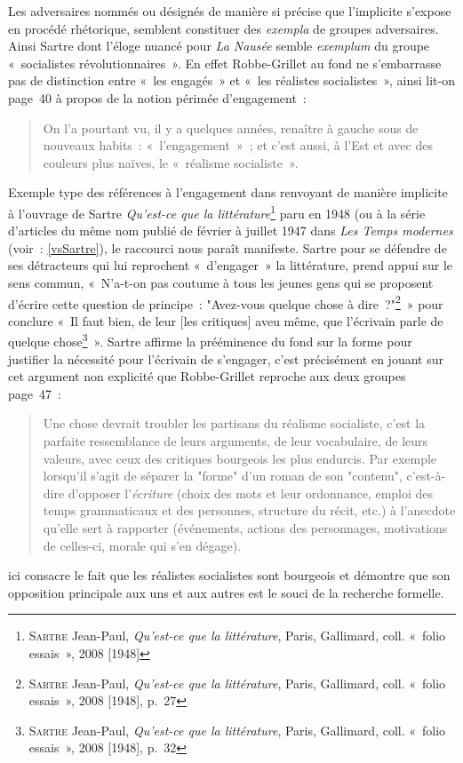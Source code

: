 \documentclass[12pt, a4paper]{article}
\begin{document}
Les adversaires nommés ou désignés de manière si précise que l'implicite s'expose en procédé rhétorique, semblent constituer des \textit{exempla} de groupes adversaires. Ainsi Sartre dont l'éloge nuancé pour \textit{La Nausée} semble \textit{exemplum} du groupe «~socialistes révolutionnaires~». En effet Robbe-Grillet au fond ne s'embarrasse pas de distinction entre «~les engagés~» et «~les réalistes socialistes~», ainsi lit-on page~40 à propos de la notion périmée d'engagement~:
\begin{quote}
    On l’a pourtant vu, il y a quelques années, renaître à gauche sous de nouveaux habits~: «~l’engagement~»~; et c’est aussi, à l’Est et avec des couleurs plus naïves, le «~réalisme socialiste~».
\end{quote}
Exemple type des références à l'engagement dans \punr{} renvoyant de manière implicite à l'ouvrage de Sartre \textit{Qu'est-ce que la littérature}\footnote{\textsc{Sartre} Jean-Paul, \textit{Qu'est-ce que la littérature}, Paris, Gallimard, coll. «~folio essais~», 2008 [1948]} paru en 1948 (ou à la série d'articles du même nom publié de février à juillet 1947 dans \textit{Les Temps modernes} (voir~: \ref{vsSartre}), le raccourci nous paraît manifeste. Sartre pour se défendre de ses détracteurs qui lui reprochent «~d'engager~» la littérature, prend appui sur le sens commun, «~N'a-t-on pas coutume à tous les jeunes gens qui se proposent d'écrire cette question de principe~: "Avez-vous quelque chose à dire~?"\footnote{\textsc{Sartre} Jean-Paul, \textit{Qu'est-ce que la littérature}, Paris, Gallimard, coll. «~folio essais~», 2008 [1948], p.~27}~» pour conclure «~Il faut bien, de leur [les critiques] aveu même, que l'écrivain parle de quelque chose\footnote{\textsc{Sartre} Jean-Paul, \textit{Qu'est-ce que la littérature}, Paris, Gallimard, coll. «~folio essais~», 2008 [1948], p.~32}~». Sartre affirme la prééminence du fond sur la forme pour justifier la nécessité pour l'écrivain de s'engager, c'est précisément en jouant sur cet argument non explicité que Robbe-Grillet reproche aux deux groupes page~47~:
\begin{quote}
    Une chose devrait troubler les partisans du réalisme socialiste, c'est la parfaite ressemblance de leurs arguments, de leur vocabulaire, de leurs valeurs, avec ceux des critiques bourgeois les plus endurcis. Par exemple lorsqu'il s'agit de séparer la "forme" d'un roman de son "contenu", c'est-à-dire d'opposer l'\textit{écriture} (choix des mots et leur ordonnance, emploi des temps grammaticaux et des personnes, structure du récit, etc.) à l'anecdote qu'elle sert à rapporter (événements, actions des personnages, motivations de celles-ci, morale qui s'en dégage).
\end{quote}
\robbe{} ici consacre le fait que les réalistes socialistes sont bourgeois et démontre que son opposition principale aux uns et aux autres est le souci de la recherche formelle.
\end{document}
